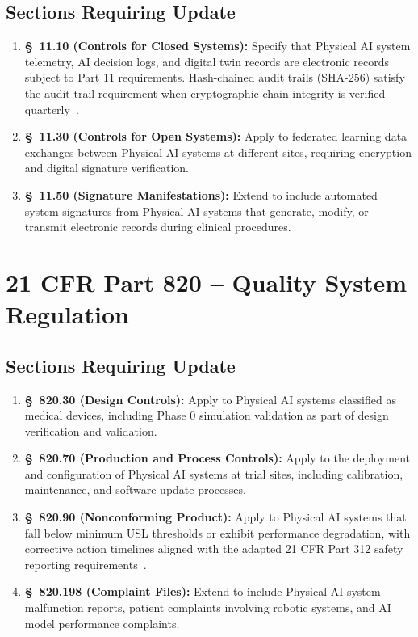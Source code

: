\subsection{Sections Requiring Update}

\begin{enumerate}[label=(\alph*)]
\item \textbf{\S~11.10 (Controls for Closed Systems):} Specify that Physical
  AI system telemetry, AI decision logs, and digital twin records are
  electronic records subject to Part 11 requirements. Hash-chained audit
  trails (SHA-256) satisfy the audit trail requirement when cryptographic
  chain integrity is verified quarterly~\cite{iche6r3adapt}.

\item \textbf{\S~11.30 (Controls for Open Systems):} Apply to federated
  learning data exchanges between Physical AI systems at different sites,
  requiring encryption and digital signature verification.

\item \textbf{\S~11.50 (Signature Manifestations):} Extend to include
  automated system signatures from Physical AI systems that generate,
  modify, or transmit electronic records during clinical procedures.
\end{enumerate}

\section{21 CFR Part 820 -- Quality System Regulation}

\subsection{Sections Requiring Update}

\begin{enumerate}[label=(\alph*)]
\item \textbf{\S~820.30 (Design Controls):} Apply to Physical AI systems
  classified as medical devices, including Phase 0 simulation validation as
  part of design verification and validation.

\item \textbf{\S~820.70 (Production and Process Controls):} Apply to the
  deployment and configuration of Physical AI systems at trial sites,
  including calibration, maintenance, and software update processes.

\item \textbf{\S~820.90 (Nonconforming Product):} Apply to Physical AI
  systems that fall below minimum USL thresholds or exhibit performance
  degradation, with corrective action timelines aligned with the adapted
  21 CFR Part 312 safety reporting requirements~\cite{cfr312adapt}.

\item \textbf{\S~820.198 (Complaint Files):} Extend to include Physical AI
  system malfunction reports, patient complaints involving robotic systems,
  and AI model performance complaints.
\end{enumerate}


